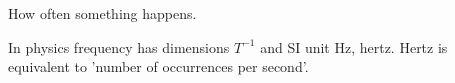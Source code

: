 How often something happens.
\par
In physics frequency has dimensions $T^{-1}$  and SI unit Hz, hertz.
Hertz is equivalent to 'number of occurrences per second'.
